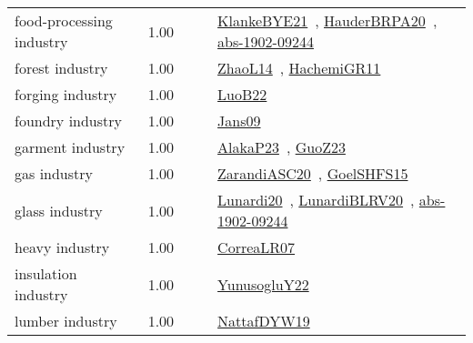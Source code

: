 {\begin{longtable}{p{3cm}r>{\raggedright\arraybackslash}p{6cm}>{\raggedright\arraybackslash}p{6cm}>{\raggedright\arraybackslash}p{8cm}}
\index{food-processing industry}\index{Industries!food-processing industry}food-processing industry &  1.00 &  &  & \href{../works/KlankeBYE21.pdf}{KlankeBYE21}~\cite{KlankeBYE21}, \href{../works/HauderBRPA20.pdf}{HauderBRPA20}~\cite{HauderBRPA20}, \href{../works/abs-1902-09244.pdf}{abs-1902-09244}~\cite{abs-1902-09244}\\
\index{forest industry}\index{Industries!forest industry}forest industry &  1.00 &  &  & \href{../works/ZhaoL14.pdf}{ZhaoL14}~\cite{ZhaoL14}, \href{../works/HachemiGR11.pdf}{HachemiGR11}~\cite{HachemiGR11}\\
\index{forging industry}\index{Industries!forging industry}forging industry &  1.00 &  &  & \href{../works/LuoB22.pdf}{LuoB22}~\cite{LuoB22}\\
\index{foundry industry}\index{Industries!foundry industry}foundry industry &  1.00 &  &  & \href{../works/Jans09.pdf}{Jans09}~\cite{Jans09}\\
\index{garment industry}\index{Industries!garment industry}garment industry &  1.00 &  &  & \href{../works/AlakaP23.pdf}{AlakaP23}~\cite{AlakaP23}, \href{../works/GuoZ23.pdf}{GuoZ23}~\cite{GuoZ23}\\
\index{gas industry}\index{Industries!gas industry}gas industry &  1.00 &  &  & \href{../works/ZarandiASC20.pdf}{ZarandiASC20}~\cite{ZarandiASC20}, \href{../works/GoelSHFS15.pdf}{GoelSHFS15}~\cite{GoelSHFS15}\\
\index{glass industry}\index{Industries!glass industry}glass industry &  1.00 &  &  & \href{../works/Lunardi20.pdf}{Lunardi20}~\cite{Lunardi20}, \href{../works/LunardiBLRV20.pdf}{LunardiBLRV20}~\cite{LunardiBLRV20}, \href{../works/abs-1902-09244.pdf}{abs-1902-09244}~\cite{abs-1902-09244}\\
\index{heavy industry}\index{Industries!heavy industry}heavy industry &  1.00 &  &  & \href{../works/CorreaLR07.pdf}{CorreaLR07}~\cite{CorreaLR07}\\
\index{insulation industry}\index{Industries!insulation industry}insulation industry &  1.00 &  &  & \href{../works/YunusogluY22.pdf}{YunusogluY22}~\cite{YunusogluY22}\\
\index{lumber industry}\index{Industries!lumber industry}lumber industry &  1.00 &  &  & \href{../works/NattafDYW19.pdf}{NattafDYW19}~\cite{NattafDYW19}\\

\end{longtable}}
